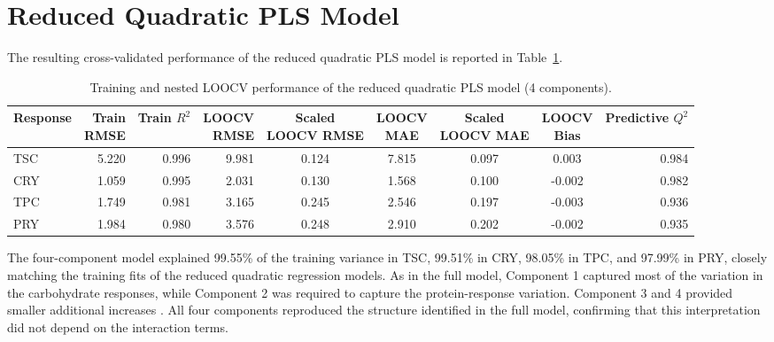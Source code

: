\documentclass[MScDSA]{uccthesis}
\begin{document}
\section{Reduced Quadratic PLS Model}
The resulting cross-validated performance of the reduced quadratic PLS model is reported in Table~\ref{tab:red_quadratic_pls_performance}.

\begin{table}[H]
\centering
\fontsize{10}{12}\selectfont
\setlength{\tabcolsep}{4pt}
\caption{Training and nested LOOCV performance of the reduced quadratic PLS model (4 components).}
\label{tab:red_quadratic_pls_performance}
\begin{tabular}{lrrrccccr}
\toprule
\textbf{Response} & \makecell{\textbf{Train}\\\textbf{RMSE}} & \makecell{\textbf{Train}\\\textbf{$R^2$}} & \makecell{\textbf{LOOCV}\\\textbf{RMSE}} & \makecell{\textbf{Scaled}\\\textbf{LOOCV RMSE}} &
\makecell{\textbf{LOOCV}\\\textbf{MAE}} & \makecell{\textbf{Scaled}\\\textbf{LOOCV MAE}} & \makecell{\textbf{LOOCV}\\\textbf{Bias}} & \makecell{\textbf{Predictive}\\\textbf{$Q^2$}} \\
\midrule
TSC & 5.220 & 0.996 & 9.981 & 0.124 & 7.815 & 0.097 & 0.003 & 0.984 \\
CRY & 1.059 & 0.995 & 2.031 & 0.130 & 1.568 & 0.100 & -0.002 & 0.982 \\
TPC & 1.749 & 0.981 & 3.165 & 0.245 & 2.546 & 0.197 & -0.003 & 0.936 \\
PRY & 1.984 & 0.980 & 3.576 & 0.248 & 2.910 & 0.202 & -0.002 & 0.935 \\
\bottomrule
\end{tabular}
\end{table}


The four-component model explained 99.55\% of the training variance in TSC, 99.51\% in CRY, 98.05\% in TPC, and 97.99\% in PRY, closely matching the training fits of the reduced quadratic regression models. As in the full model, Component 1 captured most of the variation in the carbohydrate responses, while Component 2 was required to capture the protein-response variation. Component 3 and 4 provided smaller additional increases . All four components reproduced the structure identified in the full model, confirming that this interpretation did not depend on the interaction terms.
\end{document}
